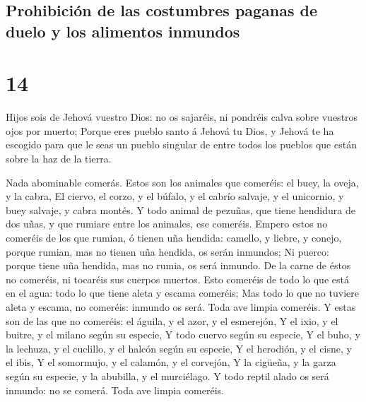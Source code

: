 \hypertarget{prohibiciuxf3n-de-las-costumbres-paganas-de-duelo-y-los-alimentos-inmundos}{%
\subsection{Prohibición de las costumbres paganas de duelo y los
alimentos
inmundos}\label{prohibiciuxf3n-de-las-costumbres-paganas-de-duelo-y-los-alimentos-inmundos}}

\hypertarget{section-05-14}{%
\section{14}\label{section-05-14}}

 Hijos sois de Jehová vuestro Dios: no os sajaréis, ni
pondréis calva sobre vuestros ojos por muerto;  Porque
eres pueblo santo á Jehová tu Dios, y Jehová te ha escogido para que le
seas un pueblo singular de entre todos los pueblos que están sobre la
haz de la tierra.

 Nada abominable comerás.  Estos son los
animales que comeréis: el buey, la oveja, y la cabra,  El
ciervo, el corzo, y el búfalo, y el cabrío salvaje, y el unicornio, y
buey salvaje, y cabra montés.  Y todo animal de pezuñas,
que tiene hendidura de dos uñas, y que rumiare entre los animales, ese
comeréis.  Empero estos no comeréis de los que rumian, ó
tienen uña hendida: camello, y liebre, y conejo, porque rumian, mas no
tienen uña hendida, os serán inmundos;  Ni puerco: porque
tiene uña hendida, mas no rumia, os será inmundo. De la carne de éstos
no comeréis, ni tocaréis sus cuerpos muertos.  Esto
comeréis de todo lo que está en el agua: todo lo que tiene aleta y
escama comeréis;  Mas todo lo que no tuviere aleta y
escama, no comeréis: inmundo os será.  Toda ave limpia
comeréis.  Y estas son de las que no comeréis: el águila,
y el azor, y el esmerejón,  Y el ixio, y el buitre, y el
milano según su especie,  Y todo cuervo según su especie,
 Y el buho, y la lechuza, y el cuclillo, y el halcón
según su especie,  Y el herodión, y el cisne, y el ibis,
 Y el somormujo, y el calamón, y el corvejón,
 Y la cigüeña, y la garza según su especie, y la
abubilla, y el murciélago.  Y todo reptil alado os será
inmundo: no se comerá.  Toda ave limpia comeréis.

